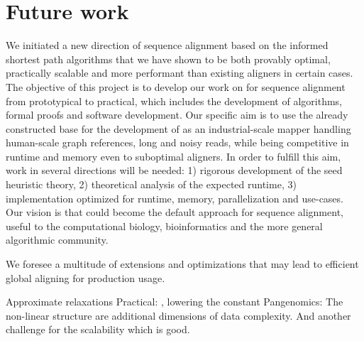 \section{Future work}

We initiated a new direction of sequence alignment based on the informed
shortest path algorithms \A that we have shown to be both provably optimal,
practically scalable and more performant than existing aligners in certain
cases. The objective of this project is to develop our work on \A for sequence
alignment from prototypical to practical, which includes the development of
algorithms, formal proofs and software development. Our specific aim is to use
the already constructed base for the development of \astarix as an
industrial-scale mapper handling human-scale graph references, long and noisy
reads, while being competitive in runtime and memory even to suboptimal
aligners. In order to fulfill this aim, work in several directions will be
needed: 1) rigorous development of the seed heuristic theory, 2) theoretical
analysis of the expected runtime, 3) implementation optimized for runtime,
memory, parallelization and use-cases. Our vision is that \A could become the
default approach for sequence alignment, useful to the computational biology,
bioinformatics and the more general algorithmic community.

We foresee a multitude of extensions and optimizations that may lead to
efficient global aligning for production usage.

Approximate relaxations
Practical: , lowering the \A constant
Pangenomics: The non-linear structure are additional dimensions of data complexity. And
another challenge for the scalability which is good.

